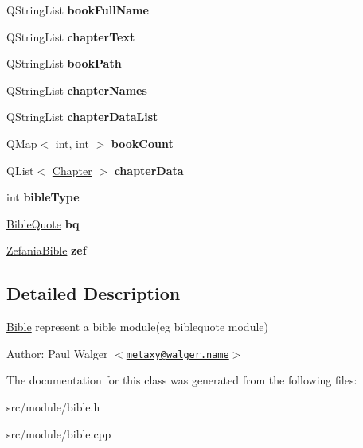 \begin{CompactItemize}
\item 
\hypertarget{classBible_c3d84e689a0365415980d6f3ebb6e561}{
QStringList \textbf{bookFullName}}
\label{classBible_c3d84e689a0365415980d6f3ebb6e561}

\item 
\hypertarget{classBible_f1659c6f7db752f7c722c7880a731957}{
QStringList \textbf{chapterText}}
\label{classBible_f1659c6f7db752f7c722c7880a731957}

\item 
\hypertarget{classBible_fcf35e16bb50b3be1d60ee74b3f8a48c}{
QStringList \textbf{bookPath}}
\label{classBible_fcf35e16bb50b3be1d60ee74b3f8a48c}

\item 
\hypertarget{classBible_21d4ae1646b7a8c816094bcbbec4bc88}{
QStringList \textbf{chapterNames}}
\label{classBible_21d4ae1646b7a8c816094bcbbec4bc88}

\item 
\hypertarget{classBible_724de0aaf066754af1b6aa50ea554e62}{
QStringList \textbf{chapterDataList}}
\label{classBible_724de0aaf066754af1b6aa50ea554e62}

\item 
\hypertarget{classBible_ed92fc6bb94809029cecfa076ae99c23}{
QMap$<$ int, int $>$ \textbf{bookCount}}
\label{classBible_ed92fc6bb94809029cecfa076ae99c23}

\item 
\hypertarget{classBible_1dca3a01d8a18110a1cd24337deeca80}{
QList$<$ \hyperlink{structChapter}{Chapter} $>$ \textbf{chapterData}}
\label{classBible_1dca3a01d8a18110a1cd24337deeca80}

\item 
\hypertarget{classBible_2627423b324b61b3bffd2ca2027a6cd0}{
int \textbf{bibleType}}
\label{classBible_2627423b324b61b3bffd2ca2027a6cd0}

\item 
\hypertarget{classBible_378fb5e8a71400bbcc14aa0bf33a6082}{
\hyperlink{classBibleQuote}{BibleQuote} \textbf{bq}}
\label{classBible_378fb5e8a71400bbcc14aa0bf33a6082}

\item 
\hypertarget{classBible_bae8c0e258ecb53dcf89563c7eac3fef}{
\hyperlink{classZefaniaBible}{ZefaniaBible} \textbf{zef}}
\label{classBible_bae8c0e258ecb53dcf89563c7eac3fef}

\end{CompactItemize}


\subsection{Detailed Description}
\hyperlink{classBible}{Bible} represent a bible module(eg biblequote module)

\begin{Desc}
\item[Author:]Paul Walger $<$\href{mailto:metaxy@walger.name}{\tt metaxy@walger.name}$>$ \end{Desc}


The documentation for this class was generated from the following files:\begin{CompactItemize}
\item 
src/module/bible.h\item 
src/module/bible.cpp\end{CompactItemize}
